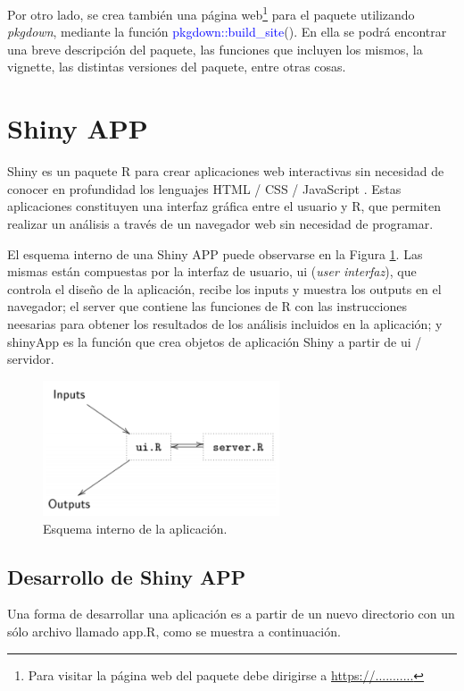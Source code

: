 Por otro lado, se crea también una página web\footnote{Para visitar la página web del paquete debe dirigirse a \url{https://...........}} para el paquete utilizando \emph{pkgdown}, mediante la función \textcolor{blue}{pkgdown::build\_site}(). En ella se podrá encontrar una breve descripción del paquete, las funciones que incluyen los mismos, la vignette, las distintas versiones del paquete, entre otras cosas.  


\section{Shiny APP}
Shiny es un paquete R para crear aplicaciones web interactivas sin necesidad de conocer en profundidad los lenguajes HTML / CSS / JavaScript . Estas aplicaciones constituyen una interfaz gráfica entre el usuario y R, que permiten realizar un análisis a través de un navegador web sin necesidad de programar.

El esquema interno de una Shiny APP puede observarse en la Figura \ref{fig:fig321}. Las mismas están compuestas por la interfaz de usuario, ui (\emph{user interfaz}), que controla el diseño de la aplicación, recibe los inputs y muestra los outputs en el navegador; el server que contiene las funciones de R con las instrucciones neesarias para obtener los resultados de los análisis incluidos en la aplicación; y shinyApp es la función que crea objetos de aplicación Shiny a partir de ui / servidor. 

\begin{figure}[H]
\begin{center}
\includegraphics[width=7cm]{./Graficos/figura7}
\end{center}
\caption{Esquema interno de la aplicación.}
\label{fig:fig321}
\end{figure}


\subsection{Desarrollo de Shiny APP}

Una forma de desarrollar una  aplicación es a partir de un nuevo directorio con un sólo archivo llamado app.R, como se muestra a continuación. 

